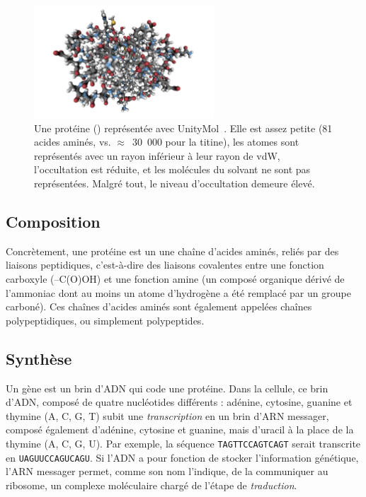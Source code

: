 \begin{appendices}
	\begin{figure}[!htbp]
		\centering
		\includegraphics[width=0.60\textwidth]{figures/ch1/1KX2}
		\caption[Une protéine en \emph{Hyperballs}]{Une protéine (\cite{bartalesi2002solution}) représentée avec UnityMol~\cite{doutreligne2014unitymol}. Elle est assez petite (81 acides aminés, vs. $\approx$~30~000 pour la titine), les atomes sont représentés avec un rayon inférieur à leur rayon de vdW, l'occultation est réduite, et les molécules du solvant ne sont pas représentées. Malgré tout, le niveau d'occultation demeure élevé.}
		\label{fig:1KX2}
	\end{figure}
	
	\subsection{Composition}
	Concrètement, une protéine est un une chaîne d'acides aminés, reliés par des liaisons peptidiques, c'est-à-dire des liaisons covalentes entre une fonction carboxyle (–C(O)OH) et une fonction amine (un composé organique dérivé de l'ammoniac dont au moins un atome d'hydrogène a été remplacé par un groupe carboné). Ces chaînes d'acides aminés sont également appelées chaînes polypeptidiques, ou simplement polypeptides.
	
	\subsection{Synthèse}
	Un gène est un brin d'ADN qui \og code \fg{}  une protéine. Dans la cellule, ce brin d'ADN, composé de quatre nucléotides différents : adénine, cytosine, guanine et thymine (A, C, G, T) subit une \emph{transcription} en un brin d'ARN messager, composé également d'adénine, cytosine et guanine, mais d'uracil à la place de la thymine (A, C, G, U). Par exemple, la séquence \texttt{TAGTTCCAGTCAGT} serait transcrite en \texttt{UAGUUCCAGUCAGU}. Si l'ADN a pour fonction de stocker l'information génétique, l'ARN messager permet, comme son nom l'indique, de la communiquer au ribosome, un complexe moléculaire chargé de l'étape de \emph{traduction}.
	

\end{appendices}
